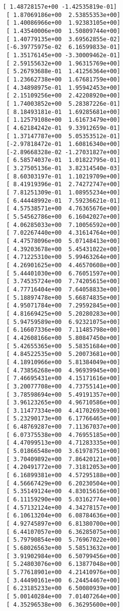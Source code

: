 \documentclass[11pt]{article}
\begin{document}
\begin{Verbatim}[commandchars=\\\{\}]
 [ 1.48728157e+00 -1.42535819e-01]
 [ 1.87069186e+00  2.53855353e+00]
 [ 1.40086966e+00  1.92383105e+00]
 [ 1.43540006e+00  1.50809744e+00]
 [ 1.40779135e+00  3.69562855e-02]
 [-6.39775975e-02  6.16599833e-01]
 [ 1.35176145e+00 -3.30009462e-01]
 [ 2.59155632e+00  1.96315769e+00]
 [ 5.26793688e-01  1.41256364e+00]
 [ 1.23662738e+00  1.67681759e+00]
 [ 4.34898975e-01  1.95942453e+00]
 [ 2.15109256e+00  2.42208920e+00]
 [ 1.74003852e+00  5.28387226e-01]
 [ 8.18493181e-01  1.69285681e+00]
 [ 1.12579108e+00  1.61673479e+00]
 [ 4.62184242e-01  9.33912659e-01]
 [ 1.37147787e+00  5.05353512e-01]
 [-2.97818472e-01  1.60816340e+00]
 [-2.89668328e-02 -1.27031827e+00]
 [ 6.58574037e-01  1.01822795e-01]
 [ 3.27505136e-01  3.82314540e-03]
 [ 8.60303197e-01  1.10219709e+00]
 [ 8.41919396e-01  2.74272747e+00]
 [ 7.81251309e-01  1.08955234e+00]
 [ 6.44448992e-01  7.59236621e-01]
 [ 4.57538571e+00  4.76365676e+00]
 [ 5.54562786e+00  6.16042027e+00]
 [ 4.06285033e+00  7.10056592e+00]
 [ 7.02267440e+00  4.31614764e+00]
 [ 4.47578096e+00  5.07148413e+00]
 [ 4.39203678e+00  5.45431022e+00]
 [ 4.71225310e+00  5.99463264e+00]
 [ 4.26901625e+00  4.46570608e+00]
 [ 5.44401030e+00  6.76051597e+00]
 [ 3.74535724e+00  7.74205615e+00]
 [ 4.77716404e+00  7.64058833e+00]
 [ 5.18897478e+00  5.66874835e+00]
 [ 4.95071784e+00  7.29592845e+00]
 [ 4.81669425e+00  5.20280283e+00]
 [ 5.94759589e+00  6.92321075e+00]
 [ 6.16607336e+00  7.11485798e+00]
 [ 4.42608166e+00  5.80847450e+00]
 [ 5.42655365e+00  5.58351684e+00]
 [ 4.84522535e+00  5.20073681e+00]
 [ 4.18910966e+00  5.81384049e+00]
 [ 4.73856268e+00  4.96939945e+00]
 [ 7.46695431e+00  4.15171616e+00]
 [ 3.20077708e+00  4.73755141e+00]
 [ 3.78598694e+00  5.49191357e+00]
 [ 3.96123265e+00  4.96710586e+00]
 [ 3.11477334e+00  4.41702693e+00]
 [ 5.23290173e+00  6.17766465e+00]
 [ 6.48769287e+00  7.11367037e+00]
 [ 6.07375538e+00  4.76955185e+00]
 [ 4.47099513e+00  4.71283335e+00]
 [ 5.01866548e+00  3.61978751e+00]
 [ 3.70409892e+00  7.86420121e+00]
 [ 4.20491772e+00  7.31812053e+00]
 [ 6.16899381e+00  4.57295188e+00]
 [ 4.56667429e+00  6.20230504e+00]
 [ 5.35149124e+00  4.83015616e+00]
 [ 6.11159290e+00  5.03162774e+00]
 [ 4.57132124e+00  4.34278157e+00]
 [ 6.10613204e+00  6.08784636e+00]
 [ 4.92745897e+00  6.81380700e+00]
 [ 6.44107057e+00  6.36285075e+00]
 [ 5.79790854e+00  5.76967022e+00]
 [ 5.68026563e+00  5.58513632e+00]
 [ 3.91902984e+00  6.50799456e+00]
 [ 5.24803076e+00  6.13877048e+00]
 [ 5.77618901e+00  4.21410976e+00]
 [ 3.44490161e+00  6.24454467e+00]
 [ 6.23185233e+00  6.50080939e+00]
 [ 5.00140284e+00  7.01407264e+00]
 [ 4.35296538e+00  6.36295600e+00]

\end{Verbatim}
\end{document}
